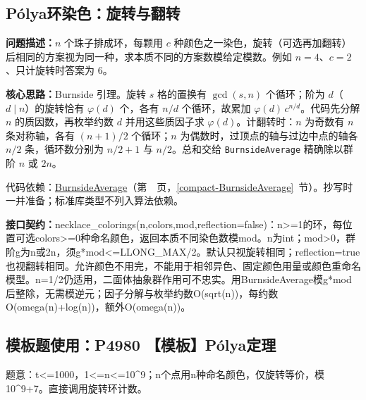

\Needspace{650pt}

\subsection{Pólya环染色：旋转与翻转}\label{compact-necklace_colorings}

\noindent\textbf{问题描述：}\allowbreak $n$ 个珠子排成环，每颗用 $c$ 种颜色之一染色，旋转（可选再加翻转）后相同的方案视为同一种，求本质不同的方案数模给定模数。例如 $n=4$、$c=2$、只计旋转时答案为 6。

\textbf{核心思路：}\allowbreak Burnside 引理。旋转 $s$ 格的置换有 $\gcd(s,n)$ 个循环；阶为 $d$（$d\mid n$）的旋转恰有 $\varphi(d)$ 个，各有 $n/d$ 个循环，故累加 $\varphi(d)\,c^{n/d}$。代码先分解 $n$ 的质因数，再枚举约数 $d$ 并用这些质因子求 $\varphi(d)$。计翻转时：$n$ 为奇数有 $n$ 条对称轴，各有 $(n+1)/2$ 个循环；$n$ 为偶数时，过顶点的轴与过边中点的轴各 $n/2$ 条，循环数分别为 $n/2+1$ 与 $n/2$。总和交给 \texttt{BurnsideAverage} 精确除以群阶 $n$ 或 $2n$。

代码依赖：\hyperref[compact-BurnsideAverage]{BurnsideAverage}（第~\pageref{compact-BurnsideAverage}~页，\ref{compact-BurnsideAverage}~节）。抄写时一并准备；标准库类型不列入算法依赖。

{\sloppy{}\noindent\textbf{接口契约：}necklace\_colorings(n,colors,mod,reflection=false)：n>=1的环，每位置可选colors>=0种命名颜色，返回本质不同染色数模mod。n为int；mod>0，群阶g为n或2n，须g*mod<=LLONG\_MAX/2。默认只视旋转相同；reflection=true也视翻转相同。允许颜色不用完，不能用于相邻异色、固定颜色用量或颜色重命名模型。n=1/2仍适用，二面体抽象群作用可不忠实。用BurnsideAverage模g*mod后整除，无需模逆元；因子分解与枚举约数O(sqrt(n))，每约数O(omega(n)+log(n))，额外O(omega(n))。\par}



\Needspace{301pt}

\subsection*{模板题使用：P4980 【模板】Pólya定理}

\label{usage-example-364}

题意：t<=1000，1<=n<=10\textasciicircum{}9；n个点用n种命名颜色，仅旋转等价，模10\textasciicircum{}9+7。直接调用旋转环计数。

